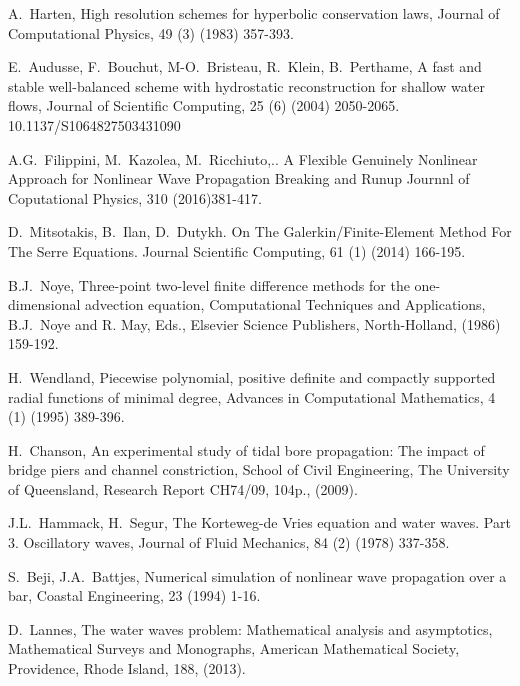\documentclass[preprint,sort&compress,1p]{article}
\begin{document}
\begin{thebibliography}{99}
 A.~Harten, High resolution schemes for hyperbolic conservation laws, Journal of Computational Physics, 49 (3) (1983) 357-393.

 E.~Audusse, F.~Bouchut, M-O.~Bristeau, R.~Klein, B.~Perthame, A fast and stable well-balanced scheme with hydrostatic reconstruction for shallow water flows, Journal of Scientific Computing, 25 (6) (2004) 2050-2065. 10.1137/S1064827503431090

 A.G.~Filippini, M.~Kazolea, M.~Ricchiuto,.. A Flexible Genuinely Nonlinear Approach for Nonlinear Wave Propagation Breaking and Runup Journnl of Coputational Physics, 310 (2016)381-417.

 D.~Mitsotakis, B.~Ilan, D.~Dutykh. On The Galerkin/Finite-Element Method For The Serre Equations. Journal Scientific Computing, 61 (1) (2014) 166-195.

  B.J.~Noye, Three-point two-level finite difference methods for the one-dimensional advection equation, Computational Techniques and Applications, B.J.~Noye and R. May, Eds., Elsevier Science Publishers, North-Holland, (1986) 159-192.

  H.~Wendland, Piecewise polynomial, positive definite and compactly supported radial functions of minimal degree, Advances in Computational Mathematics, 4 (1) (1995) 389-396.

 H.~Chanson, An experimental study of tidal bore propagation: The impact of bridge piers and channel constriction, School of Civil Engineering, The University of Queensland, Research Report CH74/09, 104p., (2009).

 J.L.~Hammack, H.~Segur, The Korteweg-de Vries equation and water waves. Part 3. Oscillatory waves, Journal of Fluid Mechanics, 84 (2) (1978) 337-358.

 S.~Beji, J.A.~Battjes, Numerical simulation of nonlinear wave propagation over a bar, Coastal Engineering, 23 (1994) 1-16.

 D.~Lannes, The water waves problem: Mathematical analysis and asymptotics, Mathematical Surveys and Monographs, American Mathematical Society, Providence, Rhode Island, 188, (2013).





\end{thebibliography}
\end{document}
